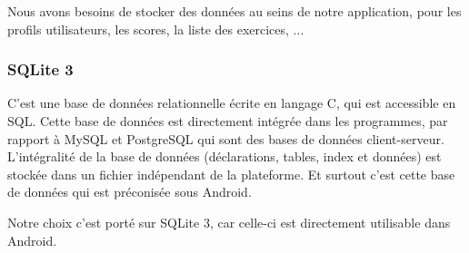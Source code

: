 Nous avons besoins de stocker des données au seins de notre application, pour les profils utilisateurs, les scores, la liste des exercices, ...


\subsubsection{SQLite 3}
C'est une base de données relationnelle écrite en langage C, qui est accessible en SQL. Cette base de données est directement intégrée dans les programmes, par rapport à MySQL et PostgreSQL qui sont des bases de données client-serveur. L'intégralité de la base de données (déclarations, tables, index et données) est stockée dans un fichier indépendant de la plateforme. Et surtout c'est cette base de données qui est préconisée sous Android.


Notre choix c'est porté sur SQLite 3, car celle-ci est directement utilisable dans Android.

